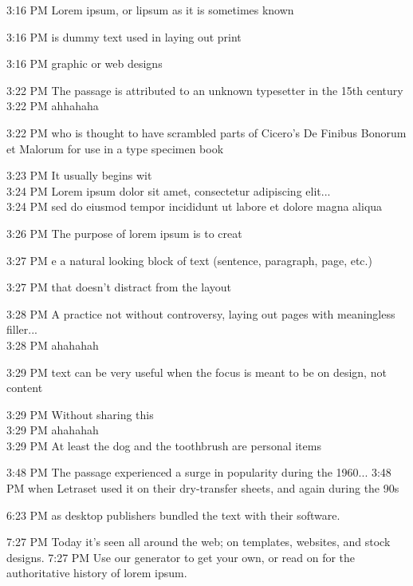 \documentclass{article}
\begin{document}
\begin{chat}
3:16 PM Lorem ipsum, or lipsum as it is sometimes known

3:16 PM is dummy text used in laying out print

3:16 PM graphic or web designs

3:22 PM The passage is attributed to an unknown typesetter in the 15th century\\
3:22 PM ahhahaha

3:22 PM who is thought to have scrambled parts of Cicero's De Finibus Bonorum et Malorum for use in a type specimen book

3:23 PM It usually begins wit\\
3:24 PM Lorem ipsum dolor sit amet, consectetur adipiscing elit...\\
3:24 PM sed do eiusmod tempor incididunt ut labore et dolore magna aliqua

3:26 PM The purpose of lorem ipsum is to creat

3:27 PM e a natural looking block of text (sentence, paragraph, page, etc.)

3:27 PM that doesn't distract from the layout

3:28 PM A practice not without controversy, laying out pages with meaningless filler...\\
3:28 PM ahahahah

3:29 PM text can be very useful when the focus is meant to be on design, not content

3:29 PM Without sharing this \\
3:29 PM ahahahah\\
3:29 PM At least the dog and the toothbrush are personal items

3:48 PM The passage experienced a surge in popularity during the 1960...
3:48 PM when Letraset used it on their dry-transfer sheets, and again during the 90s

6:23 PM as desktop publishers bundled the text with their software.

7:27 PM Today it's seen all around the web; on templates, websites, and stock designs.
7:27 PM Use our generator to get your own, or read on for the authoritative history of lorem ipsum. 

\end{chat}
\end{document}
